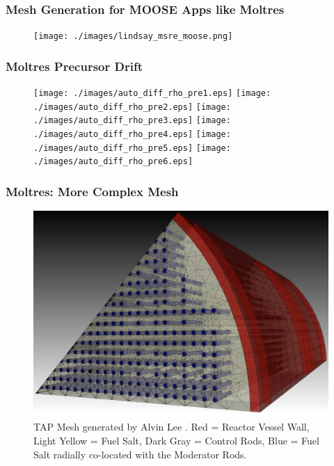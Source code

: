 

\begin{frame}
        \frametitle{Mesh Generation for MOOSE Apps like Moltres}
  \begin{figure}
   \vspace{-0.05in}
   \texttt{[image: ./images/lindsay\_msre\_moose.png]}
    \end{figure}
\end{frame}



\begin{frame}
        \frametitle{Moltres Precursor Drift}
  \begin{figure}
   \vspace{-0.1in}
   \texttt{[image: ./images/auto\_diff\_rho\_pre1.eps]}
   \texttt{[image: ./images/auto\_diff\_rho\_pre2.eps]}
   \texttt{[image: ./images/auto\_diff\_rho\_pre3.eps]}
   \texttt{[image: ./images/auto\_diff\_rho\_pre4.eps]}
   \texttt{[image: ./images/auto\_diff\_rho\_pre5.eps]}
   \texttt{[image: ./images/auto\_diff\_rho\_pre6.eps]}
    \end{figure}
\end{frame}




\begin{frame}
        \frametitle{Moltres: More Complex Mesh}
  \begin{figure}[t]
   \vspace{-0.1in}
   \hspace*{-0.45in}
   \includegraphics[height=0.75\textheight]{./images/lee-tap-mesh.png}
          \caption{TAP Mesh generated by Alvin Lee \cite{lee_neutronics_2020}. Red = Reactor Vessel Wall, Light Yellow =
Fuel Salt, Dark Gray = Control Rods, Blue = Fuel Salt radially co-located with 
          the Moderator Rods.}
    \end{figure}

\end{frame}

